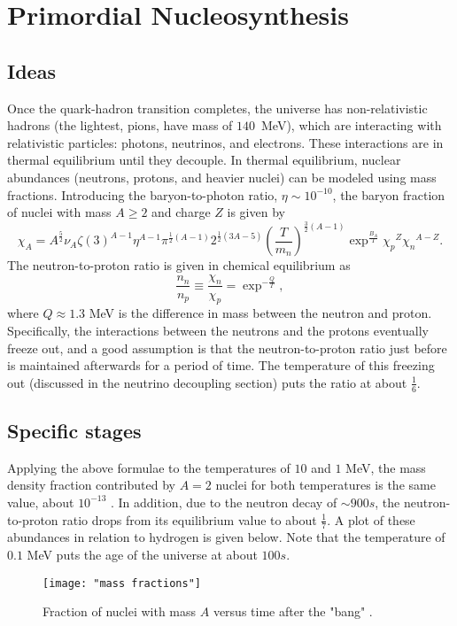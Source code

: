 \documentclass[12pt]{article}
\theoremstyle{plain}
\theoremstyle{definition}
\begin{document}
\section{Primordial Nucleosynthesis}
\subsection{Ideas}
\hspace{0.2in} Once the quark-hadron transition completes, the universe has non-relativistic hadrons (the lightest, pions, have mass of $140$ \,MeV), which are interacting with relativistic particles: photons, neutrinos, and electrons. These interactions are in thermal equilibrium until they decouple. In thermal equilibrium, nuclear abundances (neutrons, protons, and heavier nuclei) can be modeled using mass fractions. Introducing the baryon-to-photon ratio, $\eta\sim 10^{-10}$, the baryon fraction of nuclei with mass $A\geq2$ and charge $Z$ is given by \cite{Kolb:1990vq}
\begin{equation}
\chi_A=A^{\frac{5}{2}}\nu_A\zeta(3)^{A-1}\eta^{A-1}\pi^{\frac{1}{2}(A-1)}2^{\frac{1}{2}(3A-5)}\left(\frac{T}{m_n}\right)^{\frac{3}{2}(A-1)}\exp^{\frac{B_A}{T}}{\chi_p}^{Z}{\chi_n}^{A-Z}.
\end{equation}
The neutron-to-proton ratio is given in chemical equilibrium as
\begin{equation}
\frac{n_{n}}{n_{p}}\equiv\frac{\chi_{n}}{\chi_{p}}=\exp^{-\frac{Q}{T}},
\end{equation}
where $Q\approx1.3$ MeV is the difference in mass between the neutron and proton. Specifically, the interactions between the neutrons and the protons eventually freeze out, and a good assumption is that the neutron-to-proton ratio just before is maintained afterwards for a period of time. The temperature of this freezing out (discussed in the neutrino decoupling section) puts the ratio at about $\frac{1}{6}$. 
\subsection{Specific stages}
\hspace{0.2in} Applying the above formulae to the temperatures of $10$ and $1$ MeV, the mass density fraction contributed by $A=2$ nuclei for both temperatures is the same value, about $10^{-13}$ . In addition, due to the neutron decay of $\sim900s$, the neutron-to-proton ratio drops from its equilibrium value to about $\frac{1}{7}$. A plot of these abundances in relation to hydrogen is given below. Note that the temperature of $0.1$ MeV puts the age of the universe at about $100s$. 
\begin{figure}[h]
\texttt{[image: "mass fractions"]}
\centering
\caption{Fraction of nuclei with mass $A$ versus time after the "bang" \cite{Kolb:1990vq}.}
\centering
\end{figure}
\end{document}
